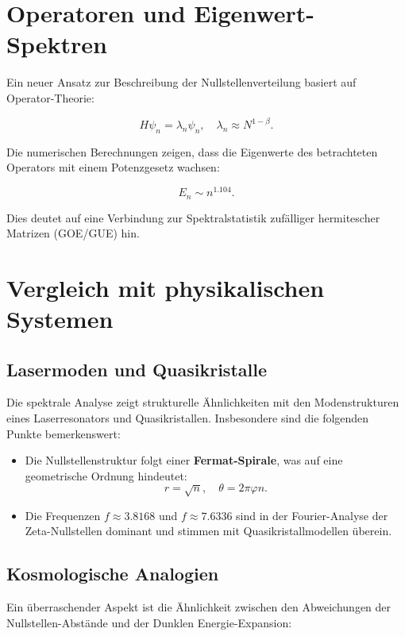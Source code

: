 \documentclass[a4paper,12pt]{article}
\begin{document}
\section{Operatoren und Eigenwert-Spektren}
Ein neuer Ansatz zur Beschreibung der Nullstellenverteilung basiert auf Operator-Theorie:

\begin{equation}
    H \psi_n = \lambda_n \psi_n, \quad \lambda_n \approx N^{1-\beta}.
\end{equation}

Die numerischen Berechnungen zeigen, dass die Eigenwerte des betrachteten Operators mit einem Potenzgesetz wachsen:

\begin{equation}
    E_n \sim n^{1.104}.
\end{equation}

Dies deutet auf eine Verbindung zur Spektralstatistik zufälliger hermitescher Matrizen (GOE/GUE) hin.

\section{Vergleich mit physikalischen Systemen}
\subsection{Lasermoden und Quasikristalle}
Die spektrale Analyse zeigt strukturelle Ähnlichkeiten mit den Modenstrukturen eines Laserresonators und Quasikristallen. Insbesondere sind die folgenden Punkte bemerkenswert:

\begin{itemize}
    \item Die Nullstellenstruktur folgt einer \textbf{Fermat-Spirale}, was auf eine geometrische Ordnung hindeutet:
    \begin{equation}
        r = \sqrt{n}, \quad \theta = 2\pi \varphi n.
    \end{equation}
    \item Die Frequenzen \( f \approx 3.8168 \) und \( f \approx 7.6336 \) sind in der Fourier-Analyse der Zeta-Nullstellen dominant und stimmen mit Quasikristallmodellen überein.
\end{itemize}

\subsection{Kosmologische Analogien}
Ein überraschender Aspekt ist die Ähnlichkeit zwischen den Abweichungen der Nullstellen-Abstände und der Dunklen Energie-Expansion:
\end{document}
